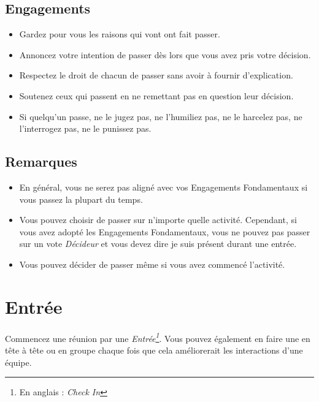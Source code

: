 \documentclass[paper=6in:9in,pagesize=pdftex,headinclude=on,footinclude=on,12pt]{scrbook}
\begin{document}
\subsection{Engagements}
\begin{itemize}
	\item Gardez pour vous les raisons qui vont ont fait passer.
	\item Annoncez votre intention de passer dès lors que vous avez pris votre décision.
	\item Respectez le droit de chacun de passer sans avoir à fournir d'explication.
	\item Soutenez ceux qui passent en ne remettant pas en question leur décision.
	\item Si quelqu'un passe, ne le jugez pas, ne l'humiliez pas, ne le harcelez pas, ne l'interrogez pas, ne le punissez pas.
\end{itemize}

\subsection{Remarques}
\begin{itemize}
	\item En général, vous ne serez pas aligné avec vos Engagements Fondamentaux si vous passez la plupart du temps.
	\item Vous pouvez choisir de passer sur n'importe quelle activité. Cependant, si vous avez adopté les Engagements
	      Fondamentaux, vous ne pouvez pas passer sur un vote \emph{Décideur} et vous devez dire \og{}je suis présent\fg{}
	      durant une entrée.
	\item Vous pouvez décider de passer même si vous avez commencé l'activité.
\end{itemize}

\section{Entrée} \label{protocole-entree}

Commencez une réunion par une \emph{Entrée\footnote{En anglais : \emph{Check In}}}.
Vous pouvez également en faire une en tête à tête ou en groupe chaque fois que
cela améliorerait les interactions d'une équipe.
\end{document}
